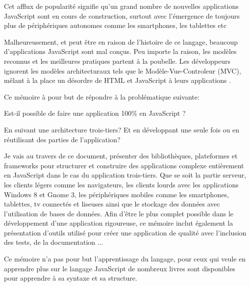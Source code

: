Cet afflux de popularité signifie qu’un grand nombre de nouvelles applications JavaScript sont en cours de construction, surtout avec l’émergence de toujours plus de périphériques autonomes comme les smartphones, les tablettes etc

Malheureusement, et peut être en raison de l’histoire de ce langage, beaucoup d’applications JavaScript sont mal conçus. Peu importe la raison, les modèles reconnus et les meilleures pratiques partent à la poubelle. Les développeurs ignorent les modèles architecturaux tels que le Modèle-Vue-Controleur (MVC), mêlant à la place un désordre de HTML et JavaScript à leurs applications .

Ce mémoire à pour but de répondre à la problématique suivante:

Est-il possible de faire une application 100\% en JavaScript ? 

En suivant une architecture trois-tiers? Et en développant une seule fois ou en réutilisant des parties de l'application?


Je vais au travers de ce document, présenter des bibliothèques, plateformes et frameworks pour structurer et construire des applications complexe entièrement en JavaScript dans le cas du application trois-tiers. Que se soit la partie serveur, les clients légers comme les navigateurs, les clients lourds avec les applications Windows 8 et Gnome 3, les périphériques mobiles comme les smartphones, tablettes, tv connectés et liseuses ainsi que le stockage des données avec l’utilisation de bases de données. Afin d'être le plus complet possible dans le développement d'une application rigoureuse, ce mémoire inclut également la présentation d'outils utilisé pour créer une application de qualité avec l’inclusion des tests, de la documentation ...

Ce mémoire n'a pas pour but l'apprentissage du langage, pour ceux qui veule en apprendre plus sur le langage JavaScript de nombreux livres sont disponibles pour apprendre à sa syntaxe et sa structure.

